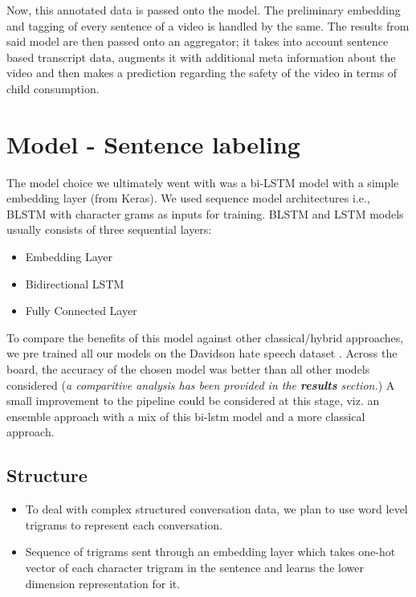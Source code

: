 \documentclass{article}[A4]
\begin{document}
Now, this annotated data is passed onto the model. The preliminary embedding and tagging of every sentence of a video is handled by the same. The results from said model are then passed onto an aggregator; it takes into account sentence based transcript data, augments it with additional meta information about the video and then makes a prediction regarding the safety of the video in terms of child consumption.

\section{Model - Sentence labeling}

The model choice we ultimately went with was a bi-LSTM model with a simple embedding layer (from Keras). We used sequence model architectures i.e., BLSTM with character grams as inputs for training. BLSTM and LSTM models usually consists of three sequential layers:
\begin{itemize}
	\item{Embedding Layer}
	\item{Bidirectional LSTM}
	\item{Fully Connected Layer}
\end{itemize}

To compare the benefits of this model against other classical/hybrid approaches, we pre trained all our models on the Davidson hate speech dataset \citep{hateoffensive}. Across the board, the accuracy of the chosen model was better than all other models considered (\textit{a comparitive analysis has been provided in the \textbf{results} section.}) A small improvement to the pipeline could be considered at this stage, viz. an ensemble approach with a mix of this bi-lstm model and a more classical approach.

\subsection{Structure}


\begin{itemize}
	\item{To deal with complex structured conversation data, we plan to use word level trigrams to represent each conversation.}
	\item{Sequence of trigrams sent through an embedding layer which takes one-hot vector of each character trigram in the sentence and learns the lower dimension representation for it.}
\end{itemize}
\end{document}
